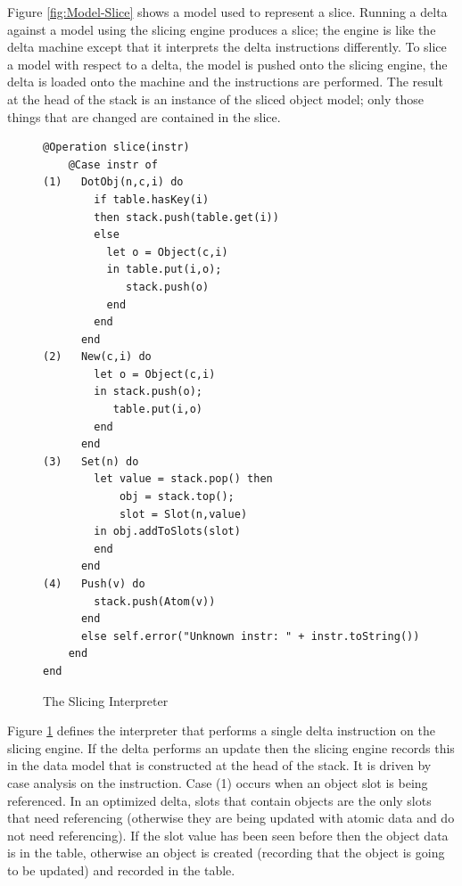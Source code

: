 Figure \ref{fig:Model-Slice} shows a model used to represent a slice.
Running a delta against a model using the slicing engine produces
a slice; the engine is like the delta machine except that it interprets
the delta instructions differently. To slice a model with respect
to a delta, the model is pushed onto the slicing engine, the delta
is loaded onto the machine and the instructions are performed. The
result at the head of the stack is an instance of the sliced object
model; only those things that are changed are contained in the slice.

%
\begin{figure}
\begin{center}

\hfill{}\begin{lstlisting}
@Operation slice(instr)
    @Case instr of
(1)   DotObj(n,c,i) do
        if table.hasKey(i)
        then stack.push(table.get(i))
        else
          let o = Object(c,i)
          in table.put(i,o);
             stack.push(o)
          end
        end
      end
(2)   New(c,i) do
        let o = Object(c,i)
        in stack.push(o);
           table.put(i,o)
        end
      end
(3)   Set(n) do
        let value = stack.pop() then
            obj = stack.top();
            slot = Slot(n,value)
        in obj.addToSlots(slot)
        end
      end
(4)   Push(v) do
        stack.push(Atom(v))
      end
      else self.error("Unknown instr: " + instr.toString())
    end
end
\end{lstlisting}\hfill{}

\caption{The Slicing Interpreter\label{fig:The-Slicing-Interpreter}}

\end{center}
\end{figure}


Figure \ref{fig:The-Slicing-Interpreter} defines the interpreter
that performs a single delta instruction on the slicing engine. If
the delta performs an update then the slicing engine records this
in the data model that is constructed at the head of the stack. It
is driven by case analysis on the instruction. Case (1) occurs when
an object slot is being referenced. In an optimized delta, slots that
contain objects are the only slots that need referencing (otherwise
they are being updated with atomic data and do not need referencing).
If the slot value has been seen before then the object data is in
the table, otherwise an object is created (recording that the object
is going to be updated) and recorded in the table.

